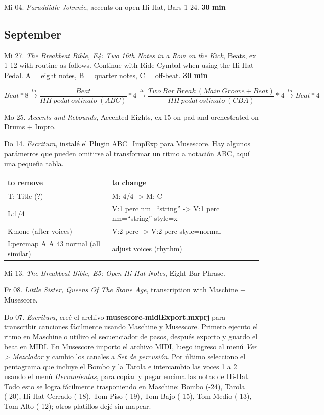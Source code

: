 \documentclass[
]{book}
\begin{document}
Mi 04. \emph{Paraddidle Johnnie}, accents on open Hi-Hat, Bars 1-24. \textbf{30 min}

\hypertarget{september-2023}{%
\subsection*{September}\label{september-2023}}

Mi 27. \emph{The Breakbeat Bible, E4: Two 16th Notes in a Row on the Kick}, Beats, ex 1-12 with routine as follows. Continue with Ride Cymbal when using the Hi-Hat Pedal. A = eight notes, B = quarter notes, C = off-beat. \textbf{30 min}

\[Beat*8 \xrightarrow[ ]{to}\frac{Beat}{HH\ pedal\ ostinato\ (ABC)}*4 \xrightarrow[ ]{to}\frac{Two\ Bar\ Break\ (Main\ Groove + Beat)}{HH\ pedal\ ostinato\ (CBA)}*4 \xrightarrow[ ]{to} Beat*4\]

Mo 25. \emph{Accents and Rebounds}, Accented Eights, ex 15 on pad and orchestrated on Drums + Impro.

Do 14. \emph{Escritura}, instalé el Plugin \href{https://blechtrottel.net/en/abc_impex.html}{ABC\_ImpExp} para Musescore. Hay algunos parámetros que pueden omitirse al transformar un ritmo a notación ABC, aquí una pequeña tabla.

\begin{longtable}[]{@{}ll@{}}
\toprule
to remove & to change \\
\midrule
\endhead
T: Title (?) & M: 4/4 -\textgreater{} M: C \\
L:1/4 & V:1 perc nm=``string'' -\textgreater{} V:1 perc nm=``string'' style=x \\
K:none (after voices) & V:2 perc -\textgreater{} V:2 perc style=normal \\
I:percmap A A 43 normal (all similar) & adjust voices (rhythm) \\
\bottomrule
\end{longtable}

Mi 13. \emph{The Breakbeat Bible, E5: Open Hi-Hat Notes}, Eight Bar Phrase.

Fr 08. \emph{Little Sister, Queens Of The Stone Age}, transcription with Maschine + Musescore.

Do 07. \emph{Escritura}, creé el archivo \textbf{musescore-midiExport.mxprj} para transcribir canciones fácilmente usando Maschine y Musescore. Primero ejecuto el ritmo en Maschine o utilizo el secuenciador de pasos, después exporto y guardo el beat en MIDI. En Musescore importo el archivo MIDI, luego ingreso al menú \emph{Ver \textgreater{} Mezclador} y cambio los canales a \emph{Set de percusión}. Por último selecciono el pentagrama que incluye el Bombo y la Tarola e intercambio las voces 1 a 2 usando el menú \emph{Herramientas}, para copiar y pegar encima las notas de Hi-Hat. Todo esto se logra fácilmente trasponiendo en Maschine: Bombo (-24), Tarola (-20), Hi-Hat Cerrado (-18), Tom Piso (-19), Tom Bajo (-15), Tom Medio (-13), Tom Alto (-12); otros platillos dejé sin mapear.
\end{document}
